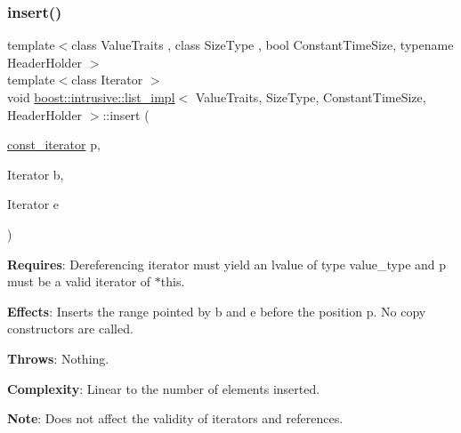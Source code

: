 \subsubsection{\texorpdfstring{insert()}{insert()}\hspace{0.1cm}{\footnotesize\ttfamily [2/2]}}
{\footnotesize\ttfamily template$<$class Value\+Traits , class Size\+Type , bool Constant\+Time\+Size, typename Header\+Holder $>$ \\
template$<$class Iterator $>$ \\
void \hyperlink{classboost_1_1intrusive_1_1list__impl}{boost\+::intrusive\+::list\+\_\+impl}$<$ Value\+Traits, Size\+Type, Constant\+Time\+Size, Header\+Holder $>$\+::insert (\begin{DoxyParamCaption}\item[{\hyperlink{classboost_1_1intrusive_1_1list__impl_af4ced710fe02662c5650d161af83d8cd}{const\+\_\+iterator}}]{p,  }\item[{Iterator}]{b,  }\item[{Iterator}]{e }\end{DoxyParamCaption})\hspace{0.3cm}{\ttfamily [inline]}}

{\bfseries Requires}\+: Dereferencing iterator must yield an lvalue of type value\+\_\+type and p must be a valid iterator of $\ast$this.

{\bfseries Effects}\+: Inserts the range pointed by b and e before the position p. No copy constructors are called.

{\bfseries Throws}\+: Nothing.

{\bfseries Complexity}\+: Linear to the number of elements inserted.

{\bfseries Note}\+: Does not affect the validity of iterators and references. \mbox{\label{classboost_1_1intrusive_1_1list__impl_a51dd273b7b1163b87030157a59189a9e}} 
